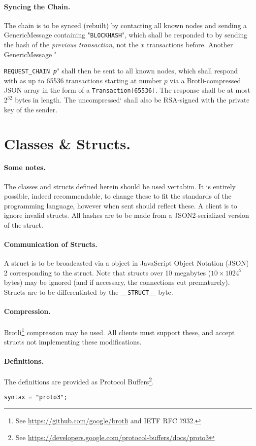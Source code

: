 \documentclass{article}
\begin{document}
\paragraph{Syncing the Chain.} The chain is to be synced (rebuilt) by
contacting all known nodes and sending a GenericMessage containing
"{\texttt{BLOCKHASH}}", which shall be responded to by sending the hash of the
{\it{previous transaction}}, not the $x$ transactions before. Another
GenericMessage "{\texttt{REQUEST\_CHAIN {\it{p}}}" shall then be sent to
all known nodes, which shall respond with as up to
65536 transactions starting at number $p$ via a Brotli-compressed JSON array in
the form of a \verb|Transaction[65536]|. The response shall be at most
$2^{32}$ bytes in length. The uncompressed` shall also be RSA-signed with the
private key of the sender.

\section{Classes \& Structs.}
\paragraph{Some notes.} The classes and structs defined herein should be used
vertabim. It is entirely possible, indeed recommendable, to change these to fit
the standards of the programming language, however when sent should reflect
these. A client is to ignore invalid structs. All hashes are to be made from
a JSON2-serialized version of the struct.

\paragraph{Communication of Structs.} A struct is to be broadcasted via a
object in JavaScript Object Notation (JSON) 2 corresponding to the struct.
Note that structs over 10 megabytes ($10 \times 1024^2$ bytes) may be ignored
(and if necessary, the connections cut prematurely). Structs are to be
differentiated by the \verb|__STRUCT__|  byte.

\paragraph{Compression.} Brotli\footnote{See
\url{https://github.com/google/brotli} and IETF RFC 7932.} compression may be
used. All clients must support these, and accept structs not implementing these
modifications.

\paragraph{Definitions.} The definitions are provided as Protocol
Buffers\footnote{See
\url{https://developers.google.com/protocol-buffers/docs/proto3}}.
\begin{lstlisting}
syntax = "proto3";
\end{lstlisting}

}
\end{document}
